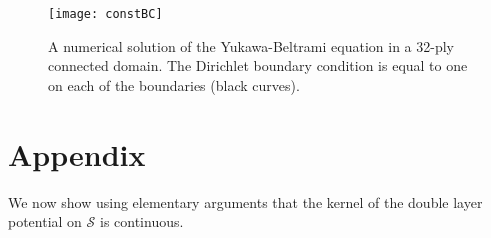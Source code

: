 \documentclass[final]{siamltex}
\begin{document}
\begin{figure}
  \centering
  \texttt{[image: constBC]}
  \caption{\label{f:32ply} A numerical solution of the Yukawa-Beltrami
  equation in a 32-ply connected domain.  The Dirichlet boundary
  condition is equal to one on each of the boundaries (black curves).}
\end{figure}


\section{Appendix}

We now show using elementary arguments that the kernel of the double layer potential on $\mathcal{S}$ is continuous.







\end{document}
